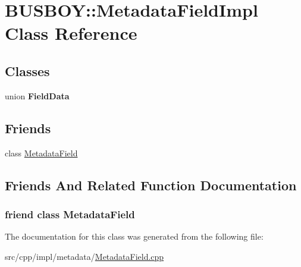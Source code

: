 \hypertarget{classBUSBOY_1_1MetadataFieldImpl}{
\section{BUSBOY::MetadataFieldImpl Class Reference}
\label{classBUSBOY_1_1MetadataFieldImpl}
}
\subsection*{Classes}
\begin{DoxyCompactItemize}
\item 
union {\bfseries FieldData}
\end{DoxyCompactItemize}
\subsection*{Friends}
\begin{DoxyCompactItemize}
\item 
class \hyperlink{classBUSBOY_1_1MetadataFieldImpl_a68d164a91e2930ba06635de666d58bd4}{MetadataField}
\end{DoxyCompactItemize}


\subsection{Friends And Related Function Documentation}
\hypertarget{classBUSBOY_1_1MetadataFieldImpl_a68d164a91e2930ba06635de666d58bd4}{
\subsubsection[{MetadataField}]{\setlength{\rightskip}{0pt plus 5cm}friend class {\bf MetadataField}}}
\label{classBUSBOY_1_1MetadataFieldImpl_a68d164a91e2930ba06635de666d58bd4}


The documentation for this class was generated from the following file:\begin{DoxyCompactItemize}
\item 
src/cpp/impl/metadata/\hyperlink{MetadataField_8cpp}{MetadataField.cpp}\end{DoxyCompactItemize}
